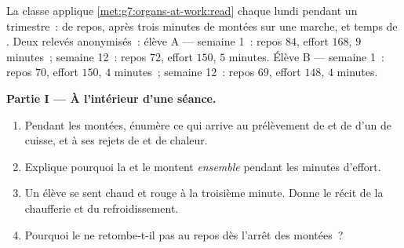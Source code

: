 \begin{problem}\label{pb:g7:organs-at-work:1}
La classe applique \cref{met:g7:organs-at-work:read} chaque lundi
pendant un trimestre~:  de repos,  après trois minutes de
montées sur une marche, et temps de . Deux relevés
anonymisés~: élève A --- semaine 1~: repos $84$, effort $168$,
 $9$ minutes~; semaine 12~: repos $72$, effort $150$,
 $5$ minutes. Élève B --- semaine 1~: repos $70$, effort
$150$,  $4$ minutes~; semaine 12~: repos $69$, effort
$148$,  $4$ minutes.

\medskip\noindent\textbf{Partie I --- À l'intérieur d'une séance.}
\begin{enumerate}
  \item Pendant les montées, énumère ce qui arrive au prélèvement
        de  et de  d'un  de cuisse, et à ses
        rejets de  et de chaleur.
  \item Explique pourquoi la  et le  montent
        \emph{ensemble} pendant les minutes d'effort.
  \item Un élève se sent chaud et rouge à la troisième minute.
        Donne le récit de la chaufferie et du refroidissement.
  \item Pourquoi le  ne retombe-t-il pas au repos dès l'arrêt
        des montées~?
\end{enumerate}


\end{problem}
